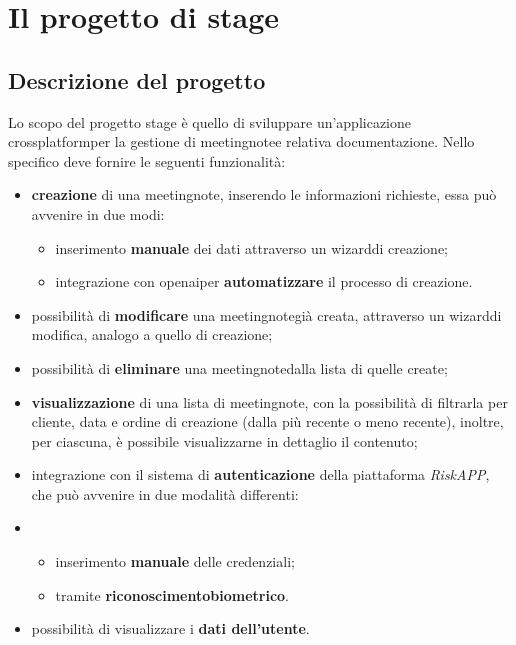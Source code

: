 \chapter{Il progetto di stage}
\label{cap:descrizione-stage}


\section{Descrizione del progetto}
\label{sec:descrizione-progetto}

Lo scopo del progetto stage è quello di sviluppare un'applicazione \gls{crossplatform}\glsoccur per la gestione di \gls{meetingnote}\glsoccur e relativa documentazione.
Nello specifico deve fornire le seguenti funzionalità:
\begin{itemize}
    \item \textbf{creazione} di una \gls{meetingnote}\glsoccur, inserendo le informazioni richieste, essa può avvenire in due modi:
    \begin{itemize}
        \item inserimento \textbf{manuale} dei dati attraverso un \gls{wizard}\glsoccur di creazione;
        \item integrazione con \gls{openai}\glsoccur per \textbf{automatizzare} il processo di creazione.
    \end{itemize}
    \item possibilità di \textbf{modificare} una \gls{meetingnote}\glsoccur già creata, attraverso un \gls{wizard}\glsoccur di modifica, analogo a quello di creazione;
    \item possibilità di \textbf{eliminare} una \gls{meetingnote}\glsoccur dalla lista di quelle create;
    \item \textbf{visualizzazione} di una lista di \gls{meetingnote}\glsoccur, con la possibilità di filtrarla per \gls{cliente}\glsoccur, data e ordine di creazione (dalla più recente o meno recente), inoltre, per ciascuna, è possibile visualizzarne in dettaglio il contenuto;
    \item integrazione con il sistema di \textbf{autenticazione} della piattaforma \emph{RiskAPP}, che può avvenire in due modalità differenti:
    \item \begin{itemize}
        \item inserimento \textbf{manuale} delle credenziali;
        \item tramite \textbf{\gls{riconoscimentobiometrico}}\glsoccur.
    \end{itemize}
    \item possibilità di visualizzare i \textbf{dati dell'utente}.
\end{itemize}

